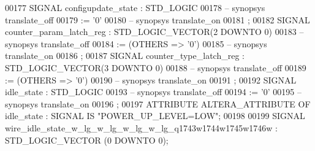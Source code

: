\begin{DoxyCode}
{00177      \textcolor{keywordflow}{SIGNAL}  \textcolor{vhdlchar}{configupdate_state} \textcolor{vhdlchar}{:}   \textcolor{comment}{STD\_LOGIC}
00178 \textcolor{keyword}{     -- synopsys translate\_off}
00179       \textcolor{vhdlchar}{:=} \textcolor{vhdlchar}{'}\textcolor{vhdllogic}{}\textcolor{vhdllogic}{0}\textcolor{vhdlchar}{'}
00180 \textcolor{keyword}{     -- synopsys translate\_on}
00181      ;
00182      \textcolor{keywordflow}{SIGNAL}  \textcolor{vhdlchar}{counter_param_latch_reg}    \textcolor{vhdlchar}{:}   \textcolor{comment}{STD\_LOGIC\_VECTOR}\textcolor{vhdlchar}{(}\textcolor{vhdllogic}{}\textcolor{vhdllogic}{2} \textcolor{keywordflow}{DOWNTO} \textcolor{vhdllogic}{}\textcolor{vhdllogic}{0}\textcolor{vhdlchar}{)}
00183 \textcolor{keyword}{     -- synopsys translate\_off}
00184       \textcolor{vhdlchar}{:=} \textcolor{vhdlchar}{(}\textcolor{keywordflow}{OTHERS} \textcolor{vhdlchar}{=}\textcolor{vhdlchar}{>} \textcolor{vhdlchar}{'}\textcolor{vhdllogic}{}\textcolor{vhdllogic}{0}\textcolor{vhdlchar}{'}\textcolor{vhdlchar}{)}
00185 \textcolor{keyword}{     -- synopsys translate\_on}
00186      ;
00187      \textcolor{keywordflow}{SIGNAL}  \textcolor{vhdlchar}{counter_type_latch_reg} \textcolor{vhdlchar}{:}   \textcolor{comment}{STD\_LOGIC\_VECTOR}\textcolor{vhdlchar}{(}\textcolor{vhdllogic}{}\textcolor{vhdllogic}{3} \textcolor{keywordflow}{DOWNTO} \textcolor{vhdllogic}{}\textcolor{vhdllogic}{0}\textcolor{vhdlchar}{)}
00188 \textcolor{keyword}{     -- synopsys translate\_off}
00189       \textcolor{vhdlchar}{:=} \textcolor{vhdlchar}{(}\textcolor{keywordflow}{OTHERS} \textcolor{vhdlchar}{=}\textcolor{vhdlchar}{>} \textcolor{vhdlchar}{'}\textcolor{vhdllogic}{}\textcolor{vhdllogic}{0}\textcolor{vhdlchar}{'}\textcolor{vhdlchar}{)}
00190 \textcolor{keyword}{     -- synopsys translate\_on}
00191      ;
00192      \textcolor{keywordflow}{SIGNAL}  \textcolor{vhdlchar}{idle_state} \textcolor{vhdlchar}{:}   \textcolor{comment}{STD\_LOGIC}
00193 \textcolor{keyword}{     -- synopsys translate\_off}
00194       \textcolor{vhdlchar}{:=} \textcolor{vhdlchar}{'}\textcolor{vhdllogic}{}\textcolor{vhdllogic}{0}\textcolor{vhdlchar}{'}
00195 \textcolor{keyword}{     -- synopsys translate\_on}
00196      ;
00197      \textcolor{keywordflow}{ATTRIBUTE} \textcolor{vhdlchar}{ALTERA_ATTRIBUTE} \textcolor{keywordflow}{OF} \textcolor{vhdlchar}{idle_state} \textcolor{vhdlchar}{:} \textcolor{keywordflow}{SIGNAL} \textcolor{keywordflow}{IS} \textcolor{keyword}{"POWER\_UP\_LEVEL=LOW"};
00198 
00199      \textcolor{keywordflow}{SIGNAL}  \textcolor{vhdlchar}{wire_idle_state_w_lg_w_lg_w_lg_w_lg_q1743w1744w1745w1746w}  \textcolor{vhdlchar}{:}   \textcolor{comment}{STD\_LOGIC\_VECTOR} \textcolor{vhdlchar}{(}\textcolor{vhdllogic}{}\textcolor{vhdllogic}{0} \textcolor{keywordflow}{DOWNTO} \textcolor{vhdllogic}{}\textcolor{vhdllogic}{0}\textcolor{vhdlchar}{)};
}
\end{DoxyCode}
